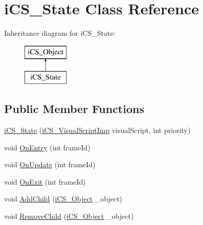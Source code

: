 \hypertarget{classi_c_s___state}{\section{i\+C\+S\+\_\+\+State Class Reference}
\label{classi_c_s___state}
}
Inheritance diagram for i\+C\+S\+\_\+\+State\+:\begin{figure}[H]
\begin{center}
\leavevmode
\includegraphics[height=2.000000cm]{classi_c_s___state}
\end{center}
\end{figure}
\subsection*{Public Member Functions}
\begin{DoxyCompactItemize}
\item 
\hyperlink{classi_c_s___state_a1ce63c6daf7b40cc070c9b6c2f2c3228}{i\+C\+S\+\_\+\+State} (\hyperlink{classi_c_s___visual_script_imp}{i\+C\+S\+\_\+\+Visual\+Script\+Imp} visual\+Script, int priority)
\item 
void \hyperlink{classi_c_s___state_ac9de7a36a10360ffece451ef11589026}{On\+Entry} (int frame\+Id)
\item 
void \hyperlink{classi_c_s___state_a750b213cf5f0ad7174c6e2b8879e16ba}{On\+Update} (int frame\+Id)
\item 
void \hyperlink{classi_c_s___state_abecab312c33391474c72fda788faebd4}{On\+Exit} (int frame\+Id)
\item 
void \hyperlink{classi_c_s___state_aa8910b396772b1c7021b37d9f17eadfc}{Add\+Child} (\hyperlink{classi_c_s___object}{i\+C\+S\+\_\+\+Object} \+\_\+object)
\item 
void \hyperlink{classi_c_s___state_a63f81311d3bb4ed96d066b437a8d2ce1}{Remove\+Child} (\hyperlink{classi_c_s___object}{i\+C\+S\+\_\+\+Object} \+\_\+object)
\end{DoxyCompactItemize}
